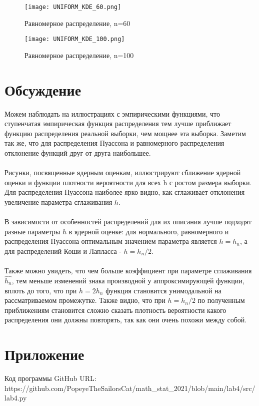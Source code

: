 \documentclass{article}
\begin{document}
\begin{figure}[H]
	{\texttt{[image: UNIFORM\_KDE\_60.png]}}
		\caption{Равномерное распределение, n=60} 
		\label{fig:normal}
	\end{figure}

\begin{figure}[H]
	{\texttt{[image: UNIFORM\_KDE\_100.png]}}
		\caption{Равномерное распределение, n=100} 
		\label{fig:normal}
	\end{figure}
	
\section{Обсуждение}
\noindent Можем наблюдать на иллюстрациях с эмпирическими функциями, что ступенчатая эмпирическая функция распределения тем лучше приближает функцию распределения реальной выборки, чем мощнее эта выборка. Заметим так же, что для распределения Пуассона и равномерного распределения отклонение функций друг от друга наибольшее.\\\\
\noindent Рисунки, посвященные ядерным оценкам, иллюстрируют сближение ядерной оценки и функции плотности вероятности для всех h с ростом размера выборки. Для распределения Пуассона наиболее ярко видно, как сглаживает отклонения увеличение параметра сглаживания $h$.\\\\
\noindent В зависимости от особенностей распределений для их описания лучше подходят разные параметры $h$ в ядерной оценке: для нормального, равномерного и распределения Пуассона оптимальным значением параметра является $h=h_n$, а для распределений Коши и Лапласса - $h=h_n/2$.\\\\
\noindent Также можно увидеть, что чем больше коэффициент при параметре сглаживания $\hat{h_n}$, тем меньше изменений знака производной у аппроксимирующей функции, вплоть до того, что при $h=2h_n$ функция становится унимодальной на рассматриваемом промежутке. Также видно, что при $h=h_n/2$ по полученным приближениям становится сложно сказать плотность вероятности какого распределения они должны повторять, так как они очень похожи между собой.

\section{Приложение}

\noindent Код программы GitHub URL:\\
\newline https://github.com/PopeyeTheSailorsCat/math\_stat\_2021/blob/main/lab4/src/lab4.py
\end{document}
